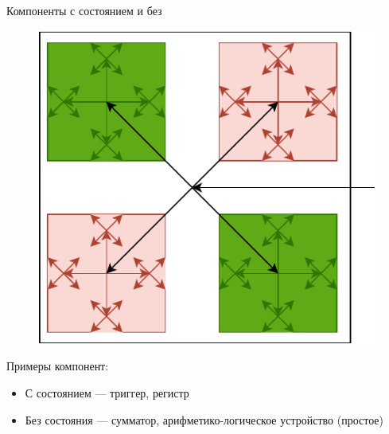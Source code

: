 \documentclass[xetex,aspectratio=43]{beamer}
\begin{document}
\begin{frame}{Компоненты с состоянием и без}
    \begin{figure}
        \includegraphics[height=0.4\textheight,page=2]{img/05.clocks.drawio-crop.pdf}
    \end{figure}
    \pause
    Примеры компонент:
    \begin{itemize}
        \item С состоянием --- триггер, регистр
        \item Без состояния --- сумматор, арифметико-логическое устройство (простое)
    \end{itemize}
\end{frame}
\end{document}
